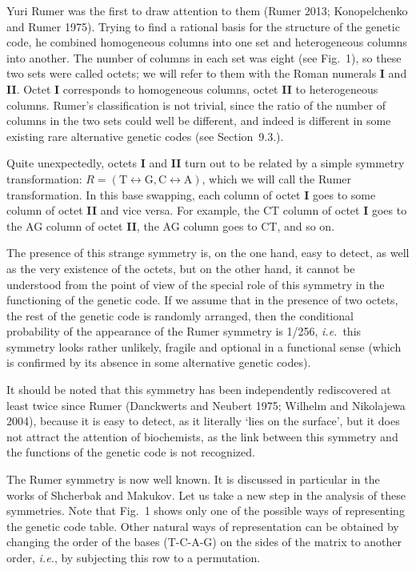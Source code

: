 \documentclass[12pt]{article}
\begin{document}
Yuri Rumer was the first to draw attention to them (Rumer 2013; Konopelchenko and Rumer 1975). Trying to find a rational basis for the structure of the genetic code, he combined homogeneous columns into one set and heterogeneous columns into another. The number of columns in each set was eight (see Fig.~1), so these two sets were called octets; we will refer to them with the Roman numerals \textbf{I} and \textbf{II}. Octet \textbf{I} corresponds to homogeneous columns, octet \textbf{II} to heterogeneous columns. Rumer's classification is not trivial, since the ratio of the number of columns in the two sets could well be different, and indeed is different in some existing rare alternative genetic codes (see Section~9.3.).

Quite unexpectedly, octets \textbf{I} and \textbf{II} turn out to be related by a simple symmetry transformation: $R = (\text{T} \leftrightarrow \text{G}, \text{C} \leftrightarrow \text{A})$, which we will call the Rumer transformation. In this base swapping, each column of octet \textbf{I} goes to some column of octet \textbf{II} and vice versa. For example, the CT column of octet \textbf{I} goes to the AG column of octet \textbf{II}, the AG column goes to CT, and so on.

The presence of this strange symmetry is, on the one hand, easy to detect, as well as the very existence of the octets, but on the other hand, it cannot be understood from the point of view of the special role of this symmetry in the functioning of the genetic code. If we assume that in the presence of two octets, the rest of the genetic code is randomly arranged, then the conditional probability of the appearance of the Rumer symmetry is 1/256, \textit{i.e.}\ this symmetry looks rather unlikely, fragile and optional in a functional sense (which is confirmed by its absence in some alternative genetic codes).

It should be noted that this symmetry has been independently rediscovered at least twice since Rumer (Danckwerts and Neubert 1975; Wilhelm and Nikolajewa 2004), because it is easy to detect, as it literally `lies on the surface', but it does not attract the attention of biochemists, as the link between this symmetry and the functions of the genetic code is not recognized.

The Rumer symmetry is now well known. It is discussed in particular in the works of Shcherbak and Makukov. Let us take a new step in the analysis of these symmetries. Note that Fig.~1 shows only one of the possible ways of representing the genetic code table. Other natural ways of representation can be obtained by changing the order of the bases (T-C-A-G) on the sides of the matrix to another order, \textit{i.e.}, by subjecting this row to a permutation.
\end{document}
